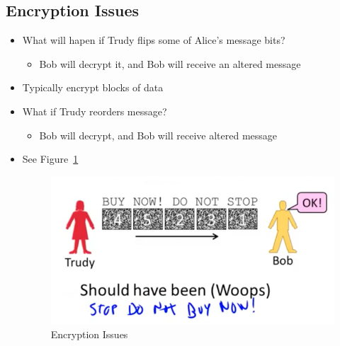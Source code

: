\documentclass[12pt]{ctexart}   %
\begin{document}
	\subsection{Encryption Issues}
	\begin{itemize}
		\item What will hapen if Trudy flips some of Alice's message bits?
		\begin{itemize}
			\item Bob will decrypt it, and Bob will receive an altered message
		\end{itemize}

		\item Typically encrypt blocks of data
		\item What if Trudy reorders message?
		\begin{itemize}
			\item Bob will decrypt, and Bob will receive altered message
		\end{itemize}
		\item See Figure~\ref{fig:10-3-2}
		  
		\begin{figure}[h!] %
		\centering
		\includegraphics[scale=0.7]{images/10-3-2}
		\caption{Encryption Issues}
		\label{fig:10-3-2}
		\end{figure}
	\end{itemize}
\end{document}
